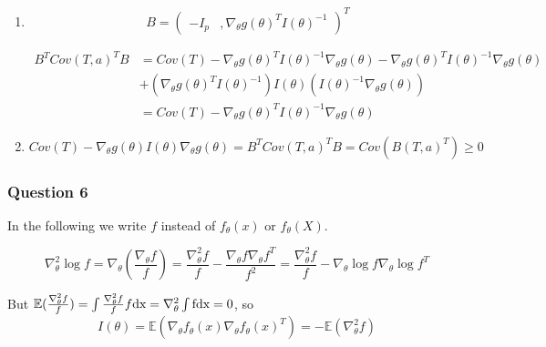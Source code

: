 \documentclass[12pt]{article}
\newcommand{\Q}[1]{\subsubsection*{Question #1}}
\newcommand{\Es}[1]{\mathbb{E}(#1)}
\begin{document}
\begin{enumerate}
\item
\[ B = \left(\begin{array}{cc}-I_p&,\nabla_\theta g(\theta)^T I(\theta)^{-1}\end{array}\right)^T \]

\begin{align}B^T Cov(T, a)^T B &= Cov(T) - \nabla_\theta g(\theta)^T I(\theta)^{-1}\nabla_\theta g(\theta) - \nabla_\theta g(\theta)^T I(\theta)^{-1}\nabla_\theta g(\theta) \\&+ (\nabla_\theta g(\theta)^T I(\theta)^{-1}) I(\theta) (I(\theta)^{-1} \nabla_\theta g(\theta) )\\
&= Cov(T) - \nabla_\theta g(\theta)^T I(\theta)^{-1} \nabla_\theta g(\theta)
\end{align}

\item $Cov(T) - \nabla_\theta g(\theta)I(\theta) \nabla_\theta g(\theta)  = B^T Cov(T, a)^T B = Cov( B(T, a)^T ) \geq 0$
\end{enumerate}

\Q{6}

In the following we write $f$ instead of $f_\theta(x)$ or $f_\theta(X)$.

$$\nabla_\theta^2 \log f = \nabla_\theta (\frac{\nabla_\theta f}{f}) = \frac{\nabla_\theta^2 f}{f} - \frac{\nabla_\theta f \nabla_\theta f^T}{f^2} = \frac{\nabla_\theta^2 f}{f} - \nabla_\theta \log f \nabla_\theta \log f^T$$


But $\Es {\frac{\nabla_\theta^2 f}{f}} = \int \frac{\nabla_\theta^2 f}{f} f \rm d x 
= \nabla_\theta ^2 \int f \rm d x = 0$, so
$$
I(\theta) = \Es{\nabla_\theta f_{\theta}(x) \nabla_\theta f_{\theta}(x)^T}  = - \Es{ \nabla_{\theta}^2 f}
$$
\end{document}
